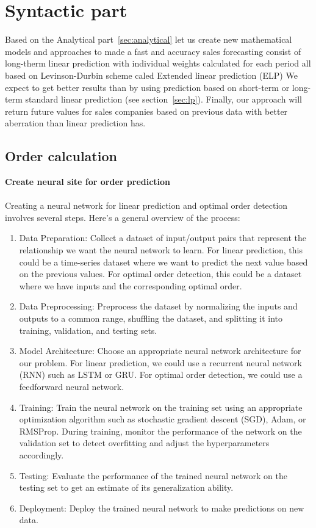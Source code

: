 \chapter{Syntactic part} \label{sec:syntactic}
Based on the Analytical part~\ref{sec:analytical} let us create new mathematical models and approaches to made a fast
and accuracy sales forecasting consist of long-therm linear prediction with individual weights calculated for each
period all based on Levinson-Durbin scheme caled Extended linear prediction (ELP)
We expect to get better results than by using prediction based on short-term or long-term standard linear
prediction (see section~\ref{sec:lp}).  Finally, our approach will return future values for sales companies
based on previous data with better aberration than linear prediction has.
    \section{Order calculation} \label{sec:ordercalc}
        \textbf{Create neural site for order prediction}\\
        \\
        Creating a neural network for linear prediction and optimal order detection involves several steps.
        Here's a general overview of the process:
        \begin{enumerate}
            \item Data Preparation: Collect a dataset of input/output pairs that represent the relationship we want
            the neural network to learn. For linear prediction, this could be a time-series dataset where we want to
            predict the next value based on the previous values. For optimal order detection, this could be a dataset
            where we have inputs and the corresponding optimal order.
            \item Data Preprocessing: Preprocess the dataset by normalizing the inputs and outputs to a common range,
            shuffling the dataset, and splitting it into training, validation, and testing sets.
            \item Model Architecture: Choose an appropriate neural network architecture for our problem. For linear
            prediction, we could use a recurrent neural network (RNN) such as LSTM or GRU. For optimal order
            detection, we could use a feedforward neural network.
            \item Training: Train the neural network on the training set using an appropriate optimization algorithm
            such as stochastic gradient descent (SGD), Adam, or RMSProp. During training, monitor the performance of the
            network on the validation set to detect overfitting and adjust the hyperparameters accordingly.
            \item Testing: Evaluate the performance of the trained neural network on the testing set
            to get an estimate of its generalization ability.
            \item Deployment: Deploy the trained neural network to make predictions on new data.
        \end{enumerate}
